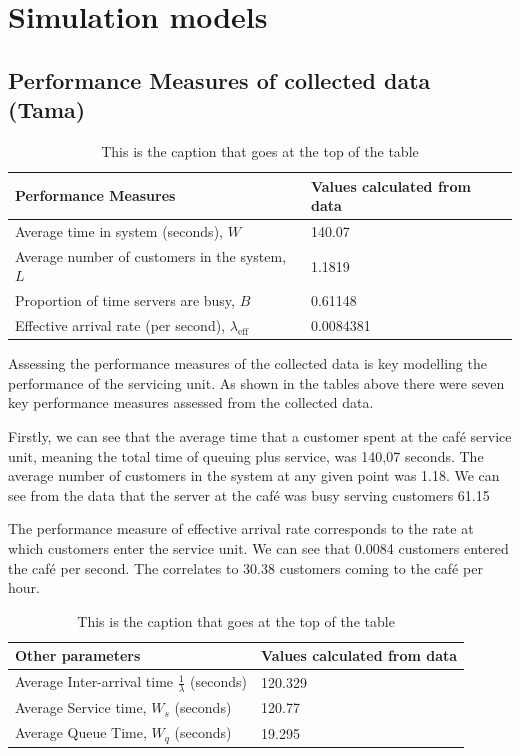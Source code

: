 \documentclass{article}
\begin{document}
\section{Simulation models}

\subsection{Performance Measures of collected data (Tama)}

\begin{table}[h!]
    \centering
    \caption{This is the caption that goes at the top of the table}
    \begin{tabu}{*{2}{X[c]}}
        \toprule
        \textbf{Performance Measures} & \textbf{Values calculated from data}\\
        \midrule
        Average time in system (seconds), $W$   & 140.07 \\
        Average number of customers in the system, $L$ & 1.1819\\
        Proportion of time servers are busy, $B$ & 0.61148  \\
        Effective arrival rate (per second), $\lambda_{\text{eff}}$ & 0.0084381\\
        \bottomrule
    \end{tabu}
    \label{tab:Original Data PF}
\end{table}

Assessing the performance measures of the collected data is key modelling the performance of the servicing unit. As shown in the tables above there were seven key performance measures assessed from the collected data. 

Firstly, we can see that the average time that a customer spent at the café service unit, meaning the total time of queuing plus service, was 140,07 seconds. The average number of customers in the system at any given point was 1.18. We can see from the data that the server at the café was busy serving customers 61.15%

The performance measure of effective arrival rate corresponds to the rate at which customers enter the service unit. We can see that 0.0084 customers entered the café per second. The correlates to 30.38 customers coming to the café per hour.

\begin{table}[h!]
    \centering
    \caption{This is the caption that goes at the top of the table}
    \begin{tabu}{*{2}{X[c]}}
        \toprule
        \textbf{Other parameters} & \textbf{Values calculated from data} \\
        \midrule
        Average Inter-arrival time $\frac{1}{\lambda}$ (seconds) & 120.329  \\
        Average Service time, $W_s$ (seconds) & 120.77  \\
        Average Queue Time, $W_q$ (seconds) & 19.295  \\
        \bottomrule
    \end{tabu}
    \label{tab:Original Data Other}
\end{table}
\end{document}

